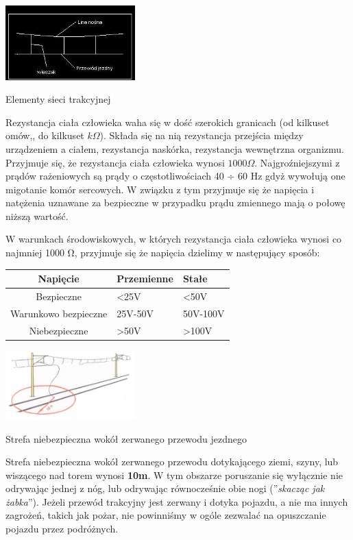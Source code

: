 \begin{marginfigure}
	\includegraphics[width=5cm]{skryptkierownik-img/siec-jezdna.jpg}
	\caption{Elementy sieci trakcyjnej}
\end{marginfigure}

Rezystancja ciała człowieka waha się w dość szerokich granicach (od kilkuset omów,, do kilkuset $k\Omega$). Składa się na nią rezystancja przejścia między urządzeniem a ciałem, rezystancja naskórka, rezystancja wewnętrzna organizmu. Przyjmuje się, że rezystancja ciała człowieka wynosi $1000\Omega$. Najgroźniejszymi z prądów rażeniowych są prądy o częstotliwościach 40 ÷ 60 Hz gdyż wywołują one migotanie komór sercowych. W związku z tym przyjmuje się że napięcia i natężenia uznawane za bezpieczne w przypadku prądu zmiennego mają o połowę niższą wartość.

W warunkach środowiskowych, w których rezystancja ciała człowieka wynosi co najmniej 1000 Ω, przyjmuje się że napięcia dzielimy w następujący sposób:

\begin{table}
	\begin{tabular}{|c|m{3cm}|m{3cm}|}
		\hline
		Napięcie&Przemienne& Stałe\\
		\hline
		Bezpieczne &<25V &<50V\\
		\hline
		Warunkowo bezpieczne &25V-50V &50V-100V\\
		\hline
		Niebezpieczne	&>50V	&>100V\\
		\hline
	\end{tabular}
\end{table}
\begin{marginfigure}
	\includegraphics[width=5cm]{skryptkierownik-img/strefa-niebezpieczna-trakcja-10.jpg}
	\caption{Strefa niebezpieczna wokół zerwanego przewodu jezdnego}
	\label{fig:przewod}
\end{marginfigure}

Strefa niebezpieczna wokół zerwanego przewodu dotykającego ziemi, szyny, lub wiszącego nad torem wynosi \textbf{10m}. W tym obszarze poruszanie się wyłącznie nie odrywając jednej z nóg, lub odrywając równocześnie obie nogi (''\textit{skacząc jak żabka}''). Jeżeli przewód trakcyjny jest zerwany i dotyka pojazdu, a nie ma innych zagrożeń, takich jak pożar, nie powinniśmy w ogóle zezwalać na opuszczanie pojazdu przez podróżnych.


